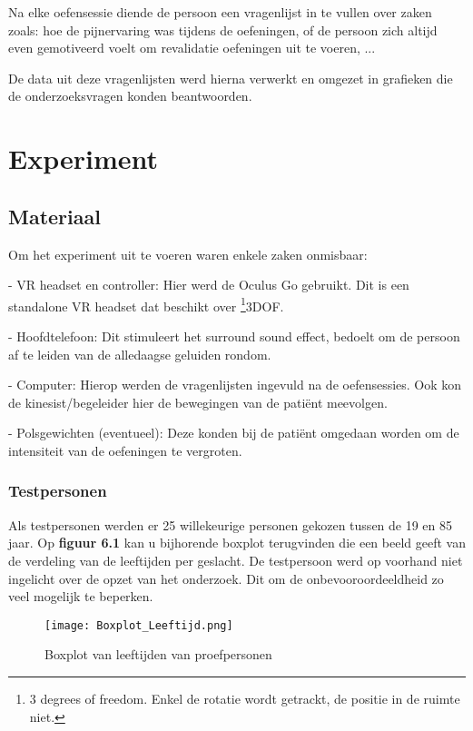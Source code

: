 Na elke oefensessie diende de persoon een vragenlijst in te vullen 
over zaken zoals: hoe de pijnervaring was tijdens de oefeningen, of de persoon zich altijd even gemotiveerd voelt om revalidatie oefeningen uit te voeren, ...

De data uit deze vragenlijsten werd hierna verwerkt en omgezet in grafieken die de onderzoeksvragen konden beantwoorden.

\chapter{Experiment}

\section{Materiaal}
Om het experiment uit te voeren waren enkele zaken onmisbaar:

- VR headset en controller: Hier werd de Oculus Go gebruikt. Dit is een standalone VR headset dat beschikt over \footnote{3 degrees of freedom. Enkel de rotatie wordt getrackt, de positie in de ruimte niet.}3DOF.

- Hoofdtelefoon: Dit stimuleert het surround sound effect, bedoelt om de persoon af te leiden van de alledaagse geluiden rondom.

- Computer: Hierop werden de vragenlijsten ingevuld na de oefensessies. Ook kon de kinesist/begeleider hier de bewegingen van de patiënt meevolgen.

- Polsgewichten (eventueel): Deze konden bij de patiënt omgedaan worden om de intensiteit van de oefeningen te vergroten.

\newpage
\subsection{Testpersonen}
Als testpersonen werden er 25 willekeurige personen gekozen tussen de 19 en 85 jaar. Op \textbf{figuur 6.1} kan u bijhorende boxplot terugvinden die een beeld geeft van de verdeling van de leeftijden per geslacht. De testpersoon werd op voorhand niet ingelicht over de opzet van het onderzoek. Dit om de onbevooroordeeldheid zo veel mogelijk te beperken.

\begin{figure}[h]
    \centering
    \texttt{[image: Boxplot\_Leeftijd.png]}
    \caption{Boxplot van leeftijden van proefpersonen}
    \label{figuur 6.1}
\end{figure}

